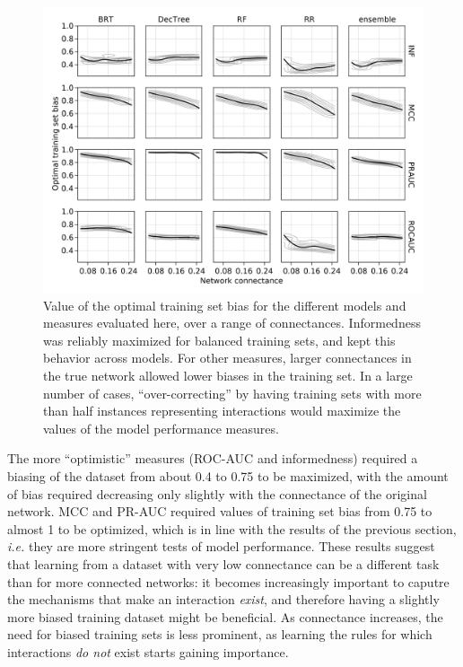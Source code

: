 \documentclass[10pt,oneside]{article}
\makeatletter
\def\maxwidth{\ifdim\Gin@nat@width>\linewidth\linewidth
\else\Gin@nat@width\fi}
\let\Oldincludegraphics\includegraphics
\renewcommand{\includegraphics}[1]{\Oldincludegraphics[width=\maxwidth]{#1}}
\makeatother
\begin{document}
\begin{figure}
\hypertarget{fig:optimbias}{%
\centering
\includegraphics{figures/optim_bias.png}
\caption{Value of the optimal training set bias for the different models
and measures evaluated here, over a range of connectances. Informedness
was reliably maximized for balanced training sets, and kept this
behavior across models. For other measures, larger connectances in the
true network allowed lower biases in the training set. In a large number
of cases, ``over-correcting'' by having training sets with more than
half instances representing interactions would maximize the values of
the model performance measures.}\label{fig:optimbias}
}
\end{figure}

The more ``optimistic'' measures (ROC-AUC and informedness) required a
biasing of the dataset from about 0.4 to 0.75 to be maximized, with the
amount of bias required decreasing only slightly with the connectance of
the original network. MCC and PR-AUC required values of training set
bias from 0.75 to almost 1 to be optimized, which is in line with the
results of the previous section, \emph{i.e.} they are more stringent
tests of model performance. These results suggest that learning from a
dataset with very low connectance can be a different task than for more
connected networks: it becomes increasingly important to caputre the
mechanisms that make an interaction \emph{exist}, and therefore having a
slightly more biased training dataset might be beneficial. As
connectance increases, the need for biased training sets is less
prominent, as learning the rules for which interactions \emph{do not}
exist starts gaining importance.
\end{document}
